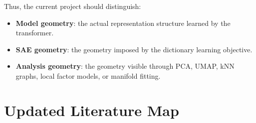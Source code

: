 \documentclass[11pt,a4paper]{article}
\begin{document}
Thus, the current project should distinguish:
\begin{itemize}[noitemsep]
  \item \textbf{Model geometry}: the actual representation structure learned by the transformer.
  \item \textbf{SAE geometry}: the geometry imposed by the dictionary learning objective.
  \item \textbf{Analysis geometry}: the geometry visible through PCA, UMAP, kNN graphs, local factor models, or manifold fitting.
\end{itemize}

\section{Updated Literature Map}
\label{sec:lit}
\end{document}
